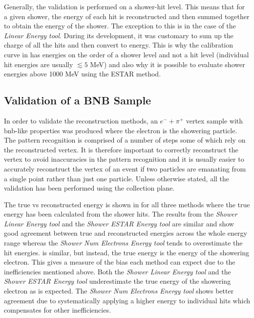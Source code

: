 Generally, the validation is performed on a shower-hit level. This means that for a given shower, the energy of each hit is reconstructed and then summed together to obtain the energy of the shower. The exception to this is in the case of the \textit{Linear Energy tool}. During its development, it was customary to sum up the charge of all the hits and then convert to energy. This is why the calibration curve in  has energies on the order of a shower level and not a hit level (individual hit energies are usually $\lesssim 5$ MeV) and also why it is possible to evaluate shower energies above 1000 MeV using the ESTAR method. 

\subsection{Validation of a BNB Sample}

In order to validate the reconstruction methods, an $e^- + \pi^+$ vertex sample with \gls{bnb}-like properties was produced where the electron is the showering particle. The pattern recognition is comprised of a number of steps some of which rely on the reconstructed vertex. It is therefore important to correctly reconstruct the vertex to avoid inaccuracies in the pattern recognition and it is usually easier to accurately reconstruct the vertex of an event if two particles are emanating from a single point rather than just one particle. Unless otherwise stated, all the validation has been performed using the collection plane. 

The true vs reconstructed energy is shown in  for all three methods where the true energy has been calculated from the shower hits. The results from the \textit{Shower Linear Energy tool} and the \textit{Shower ESTAR Energy tool} are similar and show good agreement between true and reconstructed energies across the whole energy range whereas the \textit{Shower Num Electrons Energy tool} tends to overestimate the hit energies.  is similar, but instead, the true energy is the energy of the showering electron. This gives a measure of the bias each method can expect due to the inefficiencies mentioned above. Both the \textit{Shower Linear Energy tool} and the \textit{Shower ESTAR Energy tool} underestimate the true energy of the showering electron as is expected. The \textit{Shower Num Electrons Energy tool} shows better agreement due to systematically applying a higher energy to individual hits which compensates for other inefficiencies. 

